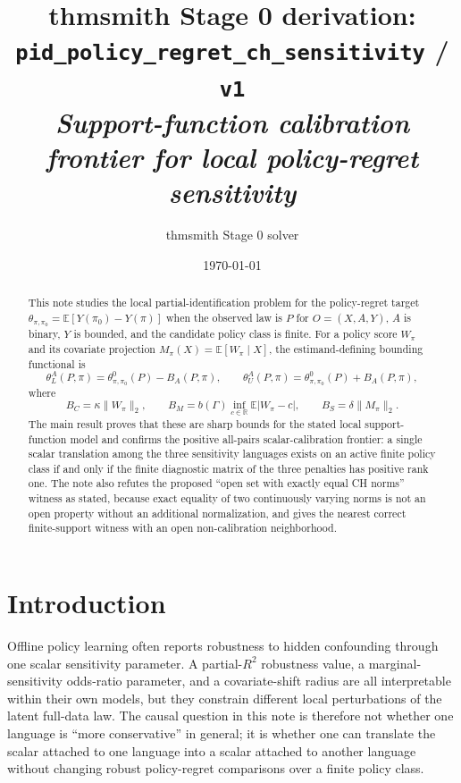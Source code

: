 \documentclass[11pt]{article}
\title{thmsmith Stage 0 derivation: \texttt{pid\_policy\_regret\_ch\_sensitivity} / \texttt{v1}%
  \\ \large\textit{Support-function calibration frontier for local policy-regret sensitivity}}
\author{thmsmith Stage 0 solver}
\date{\today}
\newcommand{\E}{\mathbb{E}}
\newcommand{\R}{\mathbb{R}}
\theoremstyle{definition}
\theoremstyle{plain}
\theoremstyle{remark}
\begin{document}
\maketitle

\providecommand{\citet}[1]{\cite{#1}}

\begin{abstract}
This note studies the local partial-identification problem for the policy-regret target
$\theta_{\pi,\pi_0}=\E[Y(\pi_0)-Y(\pi)]$ when the observed law is $P$ for
$O=(X,A,Y)$, $A$ is binary, $Y$ is bounded, and the candidate policy class is finite.
For a policy score $W_\pi$ and its covariate projection
$M_\pi(X)=\E[W_\pi\mid X]$, the estimand-defining bounding functional is
\[
  \theta^A_L(P,\pi)=\theta^0_{\pi,\pi_0}(P)-B_A(P,\pi),
  \qquad
  \theta^A_U(P,\pi)=\theta^0_{\pi,\pi_0}(P)+B_A(P,\pi),
\]
where
\[
  B_C=\kappa\|W_\pi\|_2,\qquad
  B_M=b(\Gamma)\inf_{c\in\R}\E|W_\pi-c|,\qquad
  B_S=\delta\|M_\pi\|_2.
\]
The main result proves that these are sharp bounds for the stated local support-function
model and confirms the positive all-pairs scalar-calibration frontier: a single scalar
translation among the three sensitivity languages exists on an active finite policy class
if and only if the finite diagnostic matrix of the three penalties has positive rank one.
The note also refutes the proposed ``open set with exactly equal CH norms'' witness as
stated, because exact equality of two continuously varying norms is not an open property
without an additional normalization, and gives the nearest correct finite-support witness
with an open non-calibration neighborhood.
\end{abstract}

\section{Introduction}
Offline policy learning often reports robustness to hidden confounding through one
scalar sensitivity parameter.  A partial-$R^2$ robustness value, a marginal-sensitivity
odds-ratio parameter, and a covariate-shift radius are all interpretable within their
own models, but they constrain different local perturbations of the latent full-data
law.  The causal question in this note is therefore not whether one language is
``more conservative'' in general; it is whether one can translate the scalar attached
to one language into a scalar attached to another language without changing robust
policy-regret comparisons over a finite policy class.
\end{document}
